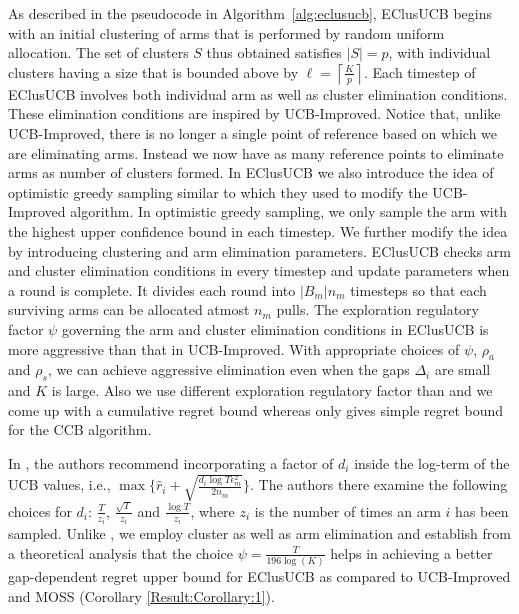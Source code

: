 As described in the pseudocode in Algorithm~\ref{alg:eclusucb}, EClusUCB begins with an initial clustering of arms that is performed by random uniform allocation. The set of clusters $S$ thus obtained satisfies $|S|=p$, with individual clusters having a size that is bounded above by $\ell=\left\lceil \frac{K}{p} \right\rceil$.
Each timestep of EClusUCB involves both individual arm as well as cluster elimination conditions. These elimination conditions are inspired by UCB-Improved. Notice that, unlike UCB-Improved, there is no longer a single point of reference based on which we are eliminating arms. Instead we now have as many reference points to eliminate arms as number of clusters formed. 
In EClusUCB we also introduce the idea of optimistic greedy sampling similar to \cite{liu2016modification} which they used to modify the UCB-Improved algorithm. In optimistic greedy sampling, we only sample the arm with the highest upper confidence bound in each timestep. We further modify the idea by introducing clustering and arm elimination parameters. EClusUCB checks arm and cluster elimination conditions in every timestep and update parameters when a round is complete. It divides each round into $|B_{m}|n_{m}$ timesteps so that each surviving arms can be allocated atmost $n_{m}$ pulls. The exploration regulatory factor $\psi$ governing the arm and cluster elimination conditions in EClusUCB is more aggressive than that in UCB-Improved. With appropriate choices of $\psi$, $\rho_a$ and $\rho_s$, we can achieve aggressive elimination even when the gaps $\Delta_i$ are small and $K$ is large. Also we use different exploration regulatory factor than \cite{liu2016modification} and we come up with a cumulative regret bound whereas \cite{liu2016modification} only gives simple regret bound for the CCB algorithm. 



In \cite{liu2016modification}, the authors recommend incorporating a factor of $d_i$ inside the log-term of the UCB values, i.e., $\max \lbrace\hat{r}_{i}+\sqrt{\frac{d_{i}\log T{\epsilon}_{m}^{2}}{2n_{m}}}\rbrace$. 
The authors there examine the following choices for $d_i$: $\frac{T}{z_{i}}$, $\frac{\sqrt{T}}{z_{i}}$ and $\frac{\log T}{z_{i}}$, where $z_{i}$ is the number of times an arm ${i}$ has been sampled.
Unlike \cite{liu2016modification}, we employ cluster as well as arm elimination and establish from a theoretical analysis that the choice $\psi=\frac{T}{196\log (K)}$ helps in achieving a better gap-dependent regret upper bound for EClusUCB as compared to UCB-Improved and MOSS (Corollary \ref{Result:Corollary:1}). 

